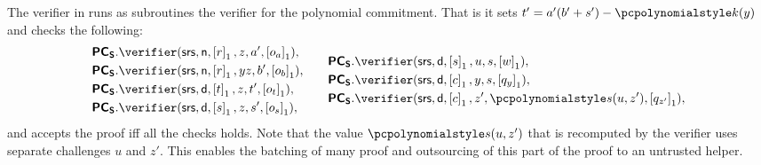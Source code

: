  The verifier
in \sonic{} runs as subroutines the verifier for the polynomial commitment. That
is it sets $t' = a'(b' + s') - \p{k}(y)$ and checks the following:
\begin{equation*}
  \begin{split}
    &\PCOMs.\verifier(\srs, \multconstr, \gone{r}, z, a', \gone{o_a}), \\
    &\PCOMs.\verifier(\srs, \multconstr, \gone{r}, yz, b', \gone{o_b}),\\
    &\PCOMs.\verifier(\srs, \dconst, \gone{t}, z, t', \gone{o_t}),\\
    &\PCOMs.\verifier(\srs, \dconst, \gone{s}, z, s', \gone{o_s}),\\
  \end{split}
  \qquad
  \begin{split}
    &\PCOMs.\verifier(\srs, \dconst, \gone{s}, u, s, \gone{w}),\\
    &\PCOMs.\verifier(\srs, \dconst, \gone{c}, y, s, \gone{q_y}),\\
    &\PCOMs.\verifier(\srs, \dconst, \gone{c}, z', \p{s}(u, z'), \gone{q_{z'}}),
  \end{split}
\end{equation*}
and accepts the proof iff all the checks holds. Note that the value
$\p{s}(u, z')$ that is recomputed by the verifier uses separate challenges $u$
and $z'$. This enables the batching of many proof and outsourcing of this
part of the proof to an untrusted helper.

